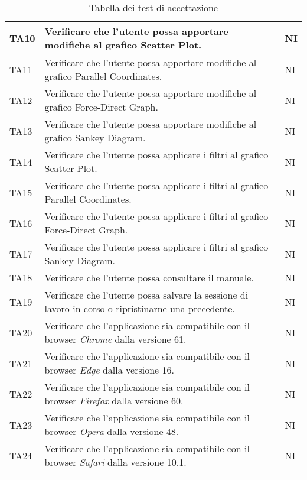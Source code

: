 \begin{center}
\begin{longtable}{|p{1.5cm}|p{11cm}|p{1cm}|}
                \rowcolor[HTML]{C0C0C0}
                TA10 & Verificare che l’utente possa apportare modifiche al grafico Scatter Plot. & NI\\ \hline
                \rowcolor[HTML]{EFEFEF}
                TA11 & Verificare che l’utente possa apportare modifiche al grafico Parallel Coordinates. & NI\\ \hline
                \rowcolor[HTML]{C0C0C0}
                TA12 & Verificare che l’utente possa apportare modifiche al grafico Force-Direct Graph. & NI\\ \hline
                \rowcolor[HTML]{EFEFEF}
                TA13 & Verificare che l’utente possa apportare modifiche al grafico Sankey Diagram. & NI\\ \hline
                \rowcolor[HTML]{C0C0C0}
                TA14 & Verificare che l’utente possa applicare i filtri al grafico Scatter Plot. & NI\\ \hline
                \rowcolor[HTML]{EFEFEF}
                TA15 & Verificare che l’utente possa applicare i filtri al grafico Parallel Coordinates. & NI\\ \hline
                \rowcolor[HTML]{C0C0C0}
                TA16 & Verificare che l’utente possa applicare i filtri al grafico Force-Direct Graph. & NI\\ \hline
                \rowcolor[HTML]{EFEFEF}
                TA17 & Verificare che l’utente possa applicare i filtri al grafico Sankey Diagram. & NI\\ \hline
                \rowcolor[HTML]{C0C0C0}
                TA18 & Verificare che l’utente possa consultare il manuale. & NI\\ \hline
                \rowcolor[HTML]{EFEFEF}
                TA19 & Verificare che l’utente possa salvare la sessione di lavoro in corso o ripristinarne una precedente. & NI\\ \hline
                \rowcolor[HTML]{C0C0C0}
                TA20 & Verificare che l'applicazione sia compatibile con il browser \textit{Chrome} dalla versione 61. & NI\\ \hline
                \rowcolor[HTML]{EFEFEF}
                TA21 & Verificare che l'applicazione sia compatibile con il browser \textit{Edge} dalla versione 16. & NI\\ \hline
                \rowcolor[HTML]{C0C0C0}
                TA22 & Verificare che l'applicazione sia compatibile con il browser \textit{Firefox} dalla versione 60. & NI\\ \hline
                \rowcolor[HTML]{EFEFEF}
                TA23 & Verificare che l'applicazione sia compatibile con il browser \textit{Opera} dalla versione 48. & NI\\ \hline
                \rowcolor[HTML]{C0C0C0}
                TA24 & Verificare che l'applicazione sia compatibile con il browser \textit{Safari} dalla versione 10.1. & NI\\ \hline
                \caption{Tabella dei test di accettazione}
            \end{longtable}
        \end{center}

